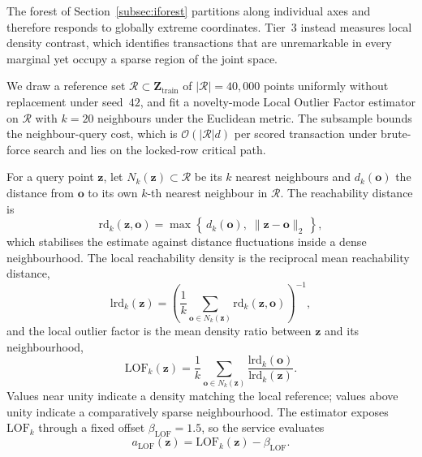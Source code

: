 \documentclass[conference]{IEEEtran}
\begin{document}
The forest of Section~\ref{subsec:iforest} partitions along individual
axes and therefore responds to globally extreme coordinates. Tier~3
instead measures local density contrast, which identifies transactions
that are unremarkable in every marginal yet occupy a sparse region of
the joint space.

We draw a reference set
$\mathcal{R}\subset\mathbf{Z}_{\mathrm{train}}$ of
$|\mathcal{R}| = 40{,}000$ points uniformly without replacement under
seed~$42$, and fit a novelty-mode Local Outlier Factor estimator on
$\mathcal{R}$ with $k=20$ neighbours under the Euclidean metric. The
subsample bounds the neighbour-query cost, which is $\mathcal{O}(|\mathcal{R}|d)$
per scored transaction under brute-force search and lies on the
locked-row critical path.

For a query point $\mathbf{z}$, let $N_{k}(\mathbf{z})\subset\mathcal{R}$
be its $k$ nearest neighbours and $d_{k}(\mathbf{o})$ the distance from
$\mathbf{o}$ to its own $k$-th nearest neighbour in $\mathcal{R}$. The
reachability distance is
\begin{equation}
\mathrm{rd}_{k}(\mathbf{z},\mathbf{o}) =
\max\!\left\{\, d_{k}(\mathbf{o}),\; \lVert \mathbf{z}-\mathbf{o}\rVert_{2} \,\right\},
\label{eq:reach}
\end{equation}
which stabilises the estimate against distance fluctuations inside a
dense neighbourhood. The local reachability density is the reciprocal
mean reachability distance,
\begin{equation}
\mathrm{lrd}_{k}(\mathbf{z}) =
\left(
\frac{1}{k}\sum_{\mathbf{o}\in N_{k}(\mathbf{z})}
\mathrm{rd}_{k}(\mathbf{z},\mathbf{o})
\right)^{-1},
\label{eq:lrd}
\end{equation}
and the local outlier factor is the mean density ratio between
$\mathbf{z}$ and its neighbourhood,
\begin{equation}
\mathrm{LOF}_{k}(\mathbf{z}) =
\frac{1}{k}\sum_{\mathbf{o}\in N_{k}(\mathbf{z})}
\frac{\mathrm{lrd}_{k}(\mathbf{o})}{\mathrm{lrd}_{k}(\mathbf{z})} .
\label{eq:lof}
\end{equation}
Values near unity indicate a density matching the local reference;
values above unity indicate a comparatively sparse neighbourhood. The
estimator exposes $\mathrm{LOF}_{k}$ through a fixed offset
$\beta_{\mathrm{LOF}} = 1.5$, so the service evaluates
\begin{equation}
a_{\mathrm{LOF}}(\mathbf{z}) = \mathrm{LOF}_{k}(\mathbf{z}) - \beta_{\mathrm{LOF}} .
\label{eq:lof_a}
\end{equation}
\end{document}
